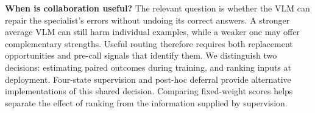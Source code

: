 \par\smallskip\noindent\textbf{When is collaboration useful?}
The relevant question is whether the VLM can repair the specialist's errors without undoing its correct answers. A stronger average VLM can still harm individual examples, while a weaker one may offer complementary strengths. Useful routing therefore requires both replacement opportunities and pre-call signals that identify them. We distinguish two decisions: estimating paired outcomes during training, and ranking inputs at deployment. Four-state supervision and post-hoc deferral provide alternative implementations of this shared decision. Comparing fixed-weight scores helps separate the effect of ranking from the information supplied by supervision.
